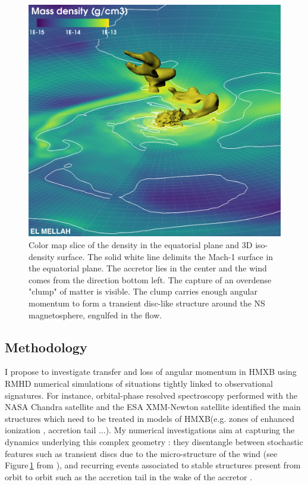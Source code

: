 \documentclass[letterpaper,12pt,onecolumn]{article}
\makeatletter
\newcommand*{\hmxb}{HMXB\@\xspace}
\newcommand*{\ns}{NS\@\xspace}
\newcommand*{\eg}{e.g.\@\xspace}
\makeatother
\begin{document}
\begin{figure}[!b]
\centering
\includegraphics[width=0.65\columnwidth]{Figures/clump_intruder.jpeg}
\caption{Color map slice of the density in the equatorial plane and 3D iso-density surface. The solid white line delimits the Mach-1 surface in the equatorial plane. The accretor lies in the center and the wind comes from the direction bottom left. The capture of an overdense "clump" of matter is visible. The clump carries enough angular momentum to form a transient disc-like structure around the \ns magnetosphere, engulfed in the flow.}
\label{fig:disc}
\end{figure} 

\renewcommand{\headrulewidth}{1pt}
\pagestyle{fancy}
\fancyhf{}
\rfoot{\thepage / \pageref{LastPage}}

\subsection*{Methodology}

I propose to investigate transfer and loss of angular momentum in \hmxb using RMHD numerical simulations of situations tightly linked to observational signatures. For instance, orbital-phase resolved spectroscopy performed with the NASA Chandra satellite and the ESA XMM-Newton satellite identified the main structures which need to be treated in models of \hmxb (\eg zones of enhanced ionization \citep{Grinberg2017}, accretion tail \citep{Martinez-Nunez2014}...). My numerical investigations aim at capturing the dynamics underlying this complex geometry : they disentangle between stochastic features such as transient discs due to the micro-structure of the wind (see Figure\,\ref{fig:disc} from \cite{ElMellah}), and recurring events associated to stable structures present from orbit to orbit such as the accretion tail in the wake of the accretor \citep{ElMellah2015}.
\end{document}
